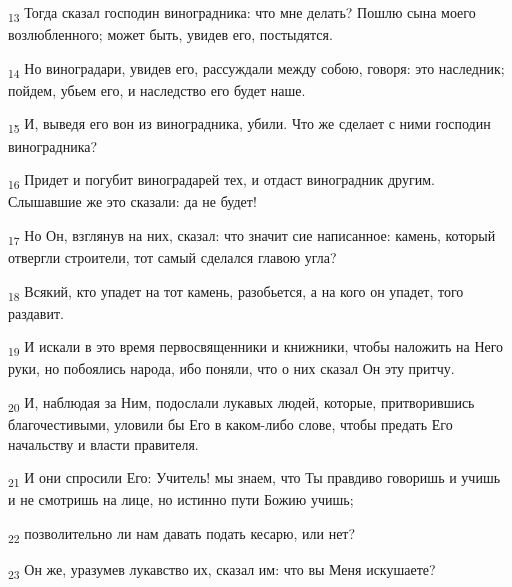 \begin{tcolorbox}
\textsubscript{13} Тогда сказал господин виноградника: что мне делать? Пошлю сына моего возлюбленного; может быть, увидев его, постыдятся.
\end{tcolorbox}
\begin{tcolorbox}
\textsubscript{14} Но виноградари, увидев его, рассуждали между собою, говоря: это наследник; пойдем, убьем его, и наследство его будет наше.
\end{tcolorbox}
\begin{tcolorbox}
\textsubscript{15} И, выведя его вон из виноградника, убили. Что же сделает с ними господин виноградника?
\end{tcolorbox}
\begin{tcolorbox}
\textsubscript{16} Придет и погубит виноградарей тех, и отдаст виноградник другим. Слышавшие же это сказали: да не будет!
\end{tcolorbox}
\begin{tcolorbox}
\textsubscript{17} Но Он, взглянув на них, сказал: что значит сие написанное: камень, который отвергли строители, тот самый сделался главою угла?
\end{tcolorbox}
\begin{tcolorbox}
\textsubscript{18} Всякий, кто упадет на тот камень, разобьется, а на кого он упадет, того раздавит.
\end{tcolorbox}
\begin{tcolorbox}
\textsubscript{19} И искали в это время первосвященники и книжники, чтобы наложить на Него руки, но побоялись народа, ибо поняли, что о них сказал Он эту притчу.
\end{tcolorbox}
\begin{tcolorbox}
\textsubscript{20} И, наблюдая за Ним, подослали лукавых людей, которые, притворившись благочестивыми, уловили бы Его в каком-либо слове, чтобы предать Его начальству и власти правителя.
\end{tcolorbox}
\begin{tcolorbox}
\textsubscript{21} И они спросили Его: Учитель! мы знаем, что Ты правдиво говоришь и учишь и не смотришь на лице, но истинно пути Божию учишь;
\end{tcolorbox}
\begin{tcolorbox}
\textsubscript{22} позволительно ли нам давать подать кесарю, или нет?
\end{tcolorbox}
\begin{tcolorbox}
\textsubscript{23} Он же, уразумев лукавство их, сказал им: что вы Меня искушаете?
\end{tcolorbox}
